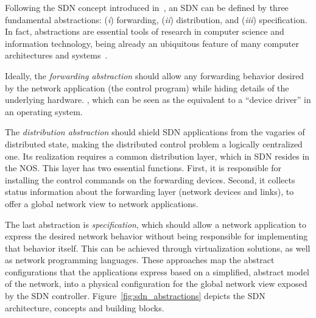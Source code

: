 Following the SDN concept introduced in~\cite{schenker2011}, an SDN can be defined by 
three fundamental abstractions: (\textit{i}) forwarding, (\textit{ii}) distribution, and 
(\textit{iii}) specification.
In fact, abstractions are essential tools of research in computer science and information technology, being already an ubiquitous feature of many computer architectures and systems~\cite{alkhatib2014}.


Ideally, the \textit{forwarding abstraction} should allow any forwarding behavior desired 
by the network application (the control program) while hiding details of the underlying hardware.
, which can be seen as the equivalent 
to a ``device driver'' in an operating system.

The \textit{distribution abstraction} should shield SDN applications from the vagaries 
of distributed state, making the distributed control problem a logically centralized one.  Its
realization requires a common distribution layer, which in SDN resides in the NOS. This layer has 
two essential functions. First, it is responsible for installing the control commands on the 
forwarding devices.  Second, it collects status information about the forwarding layer (network 
devices and links), to offer a global network view to network applications.

The last abstraction is \textit{specification}, which should allow a network application to express 
the desired network behavior without being responsible for implementing that behavior itself.
This can be achieved through virtualization solutions, as well as network programming languages.
These approaches map the abstract configurations that the applications express based on a simplified, 
abstract model of the network, into a physical configuration for the global network view exposed by 
the SDN controller. Figure~\ref{fig:sdn_abstractions} depicts the SDN architecture, concepts and 
building blocks.

